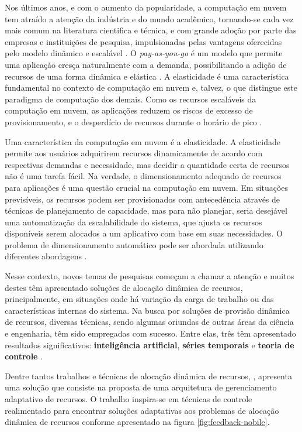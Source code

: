 Nos últimos anos, e com o aumento da popularidade, a computação em nuvem tem atraído a atenção da indústria e do mundo acadêmico, tornando-se cada vez mais comum na literatura cientifica e técnica, e com grande adoção por parte das empresas e instituições de pesquisa, impulsionadas pelas vantagens oferecidas pelo modelo dinâmico e escalável . O \textit{pay-as-you-go} é um modelo que permite uma aplicação cresça naturalmente com a demanda, possibilitando a adição de recursos de uma forma dinâmica e elástica \cite{vazquez2014}. 
A elasticidade é uma característica fundamental no contexto de computação em nuvem e, talvez, o que distingue este paradigma de computação dos demais. Como os recursos escaláveis da computação em nuvem, as aplicações reduzem os riscos de excesso de provisionamento, e o desperdício de recursos durante o horário de pico \cite{vazquez2014, galante2012}.

Uma característica da computação em nuvem é a elasticidade. A elasticidade permite aos usuários adquirirem recursos dinamicamente de acordo com respectivas demandas e necessidade, mas decidir a quantidade certa de recursos não é uma tarefa fácil. Na verdade, o dimensionamento adequado de recursos para aplicações é uma questão crucial na computação em nuvem. Em situações previsíveis, os recursos podem ser provisionados com antecedência através de técnicas de planejamento de capacidade, mas para não planejar, seria desejável uma automatização da escalabilidade do sistema, que ajusta os recursos disponíveis serem alocados a um aplicativo com base em suas necessidades. O problema de dimensionamento automático pode ser abordada utilizando diferentes abordagens \cite{Tania2012}.  

Nesse contexto, novos temas de pesquisas começam a chamar a atenção e muitos destes têm apresentado soluções de alocação dinâmica de recursos, principalmente, em situações onde há variação da carga de trabalho ou das características internas do sistema. 
Na busca por soluções de provisão dinâmica de recursos, diversas técnicas, sendo algumas oriundas de outras áreas da ciência e engenharia, têm sido empregadas com sucesso. Entre elas, três têm apresentado resultados significativos: \textbf{inteligência artificial}, \textbf{séries temporais} e \textbf{teoria de controle} \cite{Nobile2013}.

Dentre tantos trabalhos e técnicas de alocação dinâmica de recursos, , apresenta uma solução que consiste na proposta de uma arquitetura de gerenciamento adaptativo de recursos. O trabalho inspira-se em técnicas de controle realimentado para encontrar soluções adaptativas aos problemas de alocação dinâmica de recursos conforme apresentado na figura \ref{fig:feedback-nobile}.

